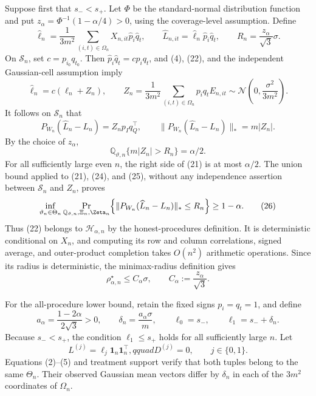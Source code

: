 Suppose first that \(s_-<s_+\).  Let \(\Phi\) be the standard-normal distribution function and put \(z_\alpha=\Phi^{-1}(1-\alpha/4)>0\), using the coverage-level assumption.  Define
\[
\widehat\ell_n=\frac1{3m^2}\sum_{(i,t)\in\Omega_n}
X_{n,it}\widehat p_i\widehat q_t,
\qquad
\widehat L_{n,it}=\widehat\ell_n\widehat p_i\widehat q_t,
\qquad
R_n=\frac{z_\alpha}{\sqrt3}\sigma.                    \tag{22}
\]
On \(\mathcal S_n\), set \(c=p_{i_0}q_{t_0}\).  Then \(\widehat p_i\widehat q_t=cp_iq_t\), and (4), (22), and the independent Gaussian-cell assumption imply
\[
\widehat\ell_n=c(\ell_n+Z_n),
\qquad
Z_n=\frac1{3m^2}\sum_{(i,t)\in\Omega_n}p_iq_tE_{n,it}
\sim\mathcal N\!\left(0,\frac{\sigma^2}{3m^2}\right).           \tag{23}
\]
It follows on \(\mathcal S_n\) that
\[
P_{W_n}(\widehat L_n-L_n)=Z_np_Iq_Q^{\top},
\qquad
\lVert P_{W_n}(\widehat L_n-L_n)\rVert_*=m|Z_n|.       \tag{24}
\]
By the choice of \(z_\alpha\),
\[
\mathbb Q_{\vartheta,n}\{m|Z_n|>R_n\}=\alpha/2.       \tag{25}
\]
For all sufficiently large even \(n\), the right side of (21) is at most \(\alpha/2\).  The union bound applied to (21), (24), and (25), without any independence assertion between \(\mathcal S_n\) and \(Z_n\), proves
\[
\inf_{\vartheta_n\in\Theta_n}
\Pr_{\mathbb Q_{\vartheta,n},\Xi_n,\Zeta_n}
\!\left\{\lVert P_{W_n}(\widehat L_n-L_n)\rVert_*\le R_n\right\}
\ge1-\alpha.                                            \tag{26}
\]
Thus (22) belongs to \(\mathcal H_{\alpha,n}\) by the honest-procedures definition.  It is deterministic conditional on \(X_n\), and computing its row and column correlations, signed average, and outer-product completion takes \(O(n^2)\) arithmetic operations.  Since its radius is deterministic, the minimax-radius definition gives
\[
\rho_{\alpha,n}^{\star}\le C_\alpha\sigma,
\qquad C_\alpha:=\frac{z_\alpha}{\sqrt3}.             \tag{27}
\]

For the all-procedure lower bound, retain the fixed signs \(p_i=q_t=1\), and define
\[
a_\alpha=\frac{1-2\alpha}{2\sqrt3}>0,
\qquad
\delta_n=\frac{a_\alpha\sigma}{m},
\qquad
\ell_0=s_-,\qquad \ell_1=s_-+\delta_n.                \tag{28}
\]
Because \(s_-<s_+\), the condition \(\ell_1\le s_+\) holds for all sufficiently large \(n\).  Let
\[
L^{(j)}=\ell_j\mathbf1_n\mathbf1_n^{\top},qquad D^{(j)}=0,
\qquad j\in\{0,1\}.
\]
Equations (2)--(5) and treatment support verify that both tuples belong to the same \(\Theta_n\).  Their observed Gaussian mean vectors differ by \(\delta_n\) in each of the \(3m^2\) coordinates of \(\Omega_n\).

